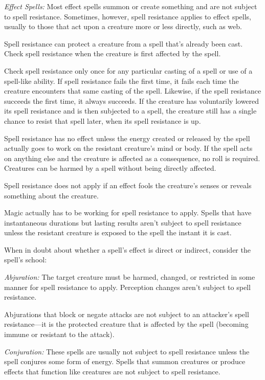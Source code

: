 \textit{Effect Spells:} Most effect spells summon or create something and are not subject to spell resistance. Sometimes, however, spell resistance applies to effect spells, usually to those that act upon a creature more or less directly, such as web.

Spell resistance can protect a creature from a spell that's already been cast. Check spell resistance when the creature is first affected by the spell.

Check spell resistance only once for any particular casting of a spell or use of a spell-like ability. If spell resistance fails the first time, it fails each time the creature encounters that same casting of the spell. Likewise, if the spell resistance succeeds the first time, it always succeeds. If the creature has voluntarily lowered its spell resistance and is then subjected to a spell, the creature still has a single chance to resist that spell later, when its spell resistance is up.

Spell resistance has no effect unless the energy created or released by the spell actually goes to work on the resistant creature's mind or body. If the spell acts on anything else and the creature is affected as a consequence, no roll is required. Creatures can be harmed by a spell without being directly affected.

Spell resistance does not apply if an effect fools the creature's senses or reveals something about the creature.

Magic actually has to be working for spell resistance to apply. Spells that have instantaneous durations but lasting results aren't subject to spell resistance unless the resistant creature is exposed to the spell the instant it is cast.

When in doubt about whether a spell's effect is direct or indirect, consider the spell's school:

\textit{Abjuration:} The target creature must be harmed, changed, or restricted in some manner for spell resistance to apply. Perception changes aren't subject to spell resistance.

Abjurations that block or negate attacks are not subject to an attacker's spell resistance---it is the protected creature that is affected by the spell (becoming immune or resistant to the attack).

\textit{Conjuration:} These spells are usually not subject to spell resistance unless the spell conjures some form of energy. Spells that summon creatures or produce effects that function like creatures are not subject to spell resistance.

